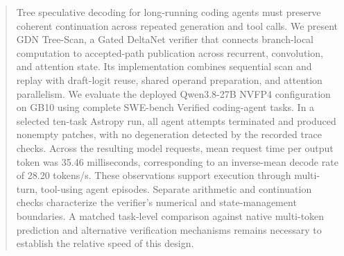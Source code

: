 \begin{abstract}
Tree speculative decoding for long-running coding agents must preserve coherent continuation across repeated generation and tool calls. We present GDN Tree-Scan, a Gated DeltaNet verifier that connects branch-local computation to accepted-path publication across recurrent, convolution, and attention state. Its implementation combines sequential scan and replay with draft-logit reuse, shared operand preparation, and attention parallelism. We evaluate the deployed Qwen3.8-27B NVFP4 configuration on GB10 using complete SWE-bench Verified coding-agent tasks. In a selected ten-task Astropy run, all agent attempts terminated and produced nonempty patches, with no degeneration detected by the recorded trace checks. Across the resulting model requests, mean request time per output token was 35.46 milliseconds, corresponding to an inverse-mean decode rate of 28.20 tokens/s. These observations support execution through multi-turn, tool-using agent episodes. Separate arithmetic and continuation checks characterize the verifier's numerical and state-management boundaries. A matched task-level comparison against native multi-token prediction and alternative verification mechanisms remains necessary to establish the relative speed of this design.
\end{abstract}

